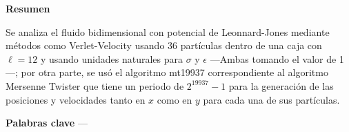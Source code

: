 



\Large


\begin{center}

    \textbf{Resumen}
    
        Se analiza el fluido bidimensional con potencial de Leonnard-Jones mediante métodos como Verlet-Velocity usando 36 partículas dentro de una caja con $\ell = 12$ y usando unidades naturales para $\sigma$ y $\epsilon$ ---Ambas tomando el valor de 1---; por otra parte, se usó el algoritmo mt19937 correspondiente al algoritmo Mersenne Twister que tiene un periodo de $2^{19937}-1$ para la generación de las posiciones y velocidades tanto en $x$ como en $y$ para cada una de sus partículas.
    
    \vspace{10pt}
     
        \textbf{Palabras clave} --- \textit{}
    
    \vspace{25pt}
     
\end{center}

